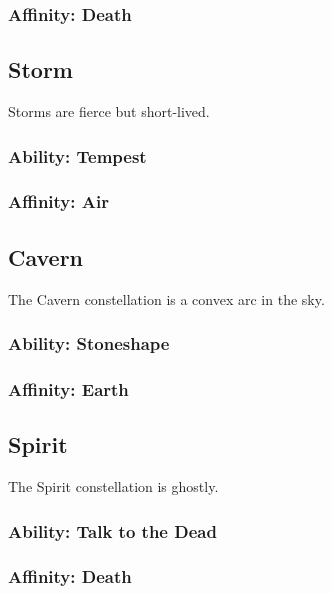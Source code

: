 \begin{multicols}{2}
\subsubsection{Affinity: Death}

\subsection{Storm}

Storms are fierce but short-lived.

\subsubsection{Ability: Tempest}

\subsubsection{Affinity: Air}

\subsection{Cavern}

The Cavern constellation is a convex arc in the sky.

\subsubsection{Ability: Stoneshape}

\subsubsection{Affinity: Earth}

\subsection{Spirit}

The Spirit constellation is ghostly.

\subsubsection{Ability: Talk to the Dead}

\subsubsection{Affinity: Death}

\end{multicols}
